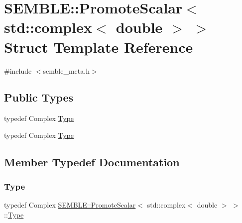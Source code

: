 \hypertarget{structSEMBLE_1_1PromoteScalar_3_01std_1_1complex_3_01double_01_4_01_4}{}\section{S\+E\+M\+B\+LE\+:\+:Promote\+Scalar$<$ std\+:\+:complex$<$ double $>$ $>$ Struct Template Reference}
\label{structSEMBLE_1_1PromoteScalar_3_01std_1_1complex_3_01double_01_4_01_4}


{\ttfamily \#include $<$semble\+\_\+meta.\+h$>$}

\subsection*{Public Types}
\begin{DoxyCompactItemize}
\item 
typedef Complex \mbox{\hyperlink{structSEMBLE_1_1PromoteScalar_3_01std_1_1complex_3_01double_01_4_01_4_a6d68c9c50d91afabefeba4274aa9f41d}{Type}}
\item 
typedef Complex \mbox{\hyperlink{structSEMBLE_1_1PromoteScalar_3_01std_1_1complex_3_01double_01_4_01_4_a6d68c9c50d91afabefeba4274aa9f41d}{Type}}
\end{DoxyCompactItemize}


\subsection{Member Typedef Documentation}
\mbox{\label{structSEMBLE_1_1PromoteScalar_3_01std_1_1complex_3_01double_01_4_01_4_a6d68c9c50d91afabefeba4274aa9f41d}} 
\subsubsection{\texorpdfstring{Type}{Type}\hspace{0.1cm}{\footnotesize\ttfamily [1/2]}}
{\footnotesize\ttfamily typedef Complex \mbox{\hyperlink{structSEMBLE_1_1PromoteScalar}{S\+E\+M\+B\+L\+E\+::\+Promote\+Scalar}}$<$ std\+::complex$<$ double $>$ $>$\+::\mbox{\hyperlink{structSEMBLE_1_1PromoteScalar_3_01std_1_1complex_3_01double_01_4_01_4_a6d68c9c50d91afabefeba4274aa9f41d}{Type}}}


